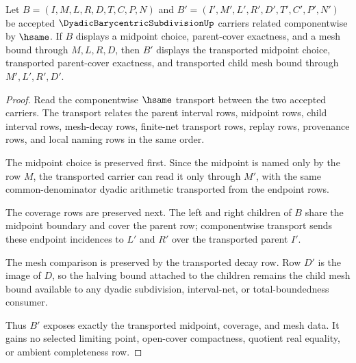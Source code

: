 \begin{theorem}
\label{thm:dyadic-barycentric-subdivision-mesh-stability}
Let $B=(I,M,L,R,D,T,C,P,N)$ and $B'=(I',M',L',R',D',T',C',P',N')$ be accepted $\DyadicBarycentricSubdivisionUp$ carriers related componentwise by $\hsame$. If $B$ displays a midpoint choice, parent-cover exactness, and a mesh bound through $M,L,R,D$, then $B'$ displays the transported midpoint choice, transported parent-cover exactness, and transported child mesh bound through $M',L',R',D'$.
\end{theorem}
\begin{proof}
Read the componentwise $\hsame$ transport between the two accepted carriers. The transport relates the parent interval rows, midpoint rows, child interval rows, mesh-decay rows, finite-net transport rows, replay rows, provenance rows, and local naming rows in the same order.

The midpoint choice is preserved first. Since the midpoint is named only by the row $M$, the transported carrier can read it only through $M'$, with the same common-denominator dyadic arithmetic transported from the endpoint rows.

The coverage rows are preserved next. The left and right children of $B$ share the midpoint boundary and cover the parent row; componentwise transport sends these endpoint incidences to $L'$ and $R'$ over the transported parent $I'$.

The mesh comparison is preserved by the transported decay row. Row $D'$ is the image of $D$, so the halving bound attached to the children remains the child mesh bound available to any dyadic subdivision, interval-net, or total-boundedness consumer.

Thus $B'$ exposes exactly the transported midpoint, coverage, and mesh data. It gains no selected limiting point, open-cover compactness, quotient real equality, or ambient completeness row.
\end{proof}


